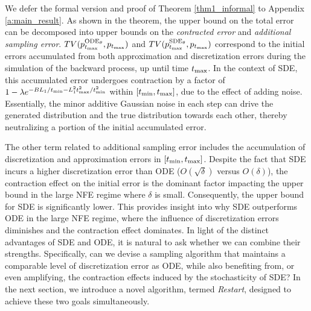We defer the formal version and proof of Theorem \ref{thm1_informal} to Appendix \ref{a:main_result}. As shown in the theorem, the upper bound on the total error can be decomposed into upper bounds on the \textit{contracted error} and \textit{additional sampling error}. {\footnotesize $TV(p^{{\textrm{ODE}_\theta}}_{t_{\textrm{max}}}, p_{t_{\textrm{max}}})$} and {\footnotesize $TV(p^{{\textrm{SDE}_\theta}}_{t_{\textrm{max}}}, p_{t_{\textrm{max}}})$} correspond to the initial errors accumulated from both approximation and discretization errors during the simulation of the backward process, up until time $t_{\textrm{max}}$. In the context of SDE, this accumulated error undergoes contraction by a factor of {\footnotesize $1 - \lambda e^{-BL_1/t_{\textrm{min}} - L_1^2 t_{\textrm{max}}^2 / t_{\textrm{min}}^2}$} within $[t_{\textrm{min}}, t_{\textrm{max}}]$, due to the effect of adding noise. Essentially, the minor additive Gaussian noise in each step can drive the generated distribution and the true distribution towards each other, thereby neutralizing a portion of the initial accumulated error.

The other term related to additional sampling error includes the accumulation of discretization and approximation errors in $[t_{\textrm{min}}, t_{\textrm{max}}]$. Despite the fact that SDE incurs a higher discretization error than ODE ($O(\sqrt{\delta})$ versus $O(\delta)$), the contraction effect on the initial error is the dominant factor impacting the upper bound in the large NFE regime where $\delta$ is small. Consequently, the upper bound for SDE is significantly lower. This provides insight into why SDE outperforms ODE in the large NFE regime, where the influence of discretization errors diminishes and the contraction effect dominates. In light of the distinct advantages of SDE and ODE, it is natural to ask whether we can combine their strengths. Specifically, can we devise a sampling algorithm that maintains a comparable level of discretization error as ODE, while also benefiting from, or even amplifying, the contraction effects induced by the stochasticity of SDE? In the next section, we introduce a novel algorithm, termed \textit{Restart}, designed to achieve these two goals simultaneously.




